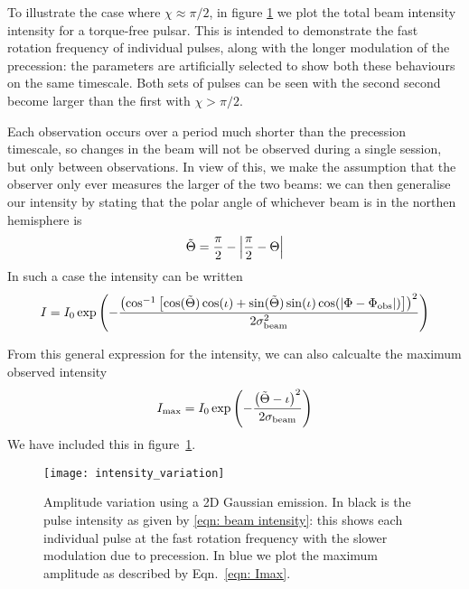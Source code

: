 \documentclass[/home/greg/Thesis/main/main.tex]{subfiles}
\begin{document}
To illustrate the case where $\chi \approx \pi/2$, in figure
\ref{fig: intensity variation} we plot the total beam intensity 
intensity for a torque-free pulsar. This is
intended to demonstrate the fast rotation frequency of individual pulses, along
with the longer modulation of the precession: the parameters are artificially
selected to show both these behaviours on the same timescale. Both sets of pulses
can be seen with the second second become larger than the first with $\chi > \pi/2$.

Each observation occurs over a period much shorter than the
precession timescale, so changes in the beam will not be observed during
a single session, but only between observations. In view of this, we make the
assumption that the observer only ever measures the larger of the two beams: we
can then generalise our intensity by stating that the polar angle of whichever
beam is in the northen hemisphere is 
\begin{align}
\tilde{\Theta} = \frac{\pi}{2} - \left| \frac{\pi}{2} - \Theta\right|
\end{align}
In such a case the intensity can be written
\begin{align}
I = I_0 \exp\left(-\frac{\left(\cos^{-1}\left[\cos(\tilde{\Theta})\cos(\iota) +
                              \sin(\tilde{\Theta})\sin(\iota)\cos(|\Phi - \Phi_{\mathrm{obs}}|)\right]
                         \right)^{2}}{2\sigma_{\textrm{beam}}^{2}}\right)
\end{align}

From this general expression for the intensity, we can also calcualte the 
maximum observed intensity
\newcommand{\repterm}{\left(\ThetaT - \iota\right)^{2}}
\begin{align}
I_\textrm{max} = I_{0} \exp\left(
    -\frac{\repterm}
          {2\sigmaB}\right)
\label{eqn: Imax}
\end{align}
We have included this in figure~\ref{fig: intensity variation}. 

\begin{figure}[htb]
\centering
\texttt{[image: intensity\_variation]}
\caption{Amplitude variation using a 2D Gaussian emission. In black is the pulse
intensity as given by \eqref{eqn: beam intensity}: this shows each individual
pulse at the fast rotation frequency with the slower modulation due to precession. 
In blue we plot the maximum amplitude as described by Eqn.~\eqref{eqn: Imax}.}
\label{fig: intensity variation}
\end{figure}
\end{document}

